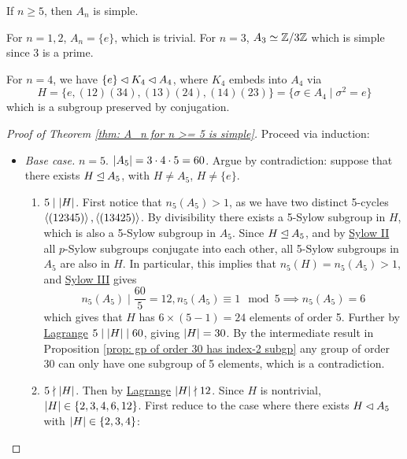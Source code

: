\begin{theorem}\label{thm: A_n for n >= 5 is simple}
    If $n \geq 5$, then $A_n$ is simple. 
\end{theorem}

\begin{remark}
    For $n = 1, 2$, $A_n = \{e\}$, which is trivial. For $n = 3$, $A_3 \simeq \mathbb{Z}/3\mathbb{Z}$ which is simple since 3 is a prime.

    For $n = 4$, we have $\{e\} \lhd K_4 \lhd A_4$, where $K_4$ embeds into $A_4$ via
    \[
        H = \{e, (1 2) (3 4), (1 3)(2 4), (1 4)(2 3)\} = \{\sigma \in A_4 \mid \sigma^2 = e\}
    \]
    which is a subgroup preserved by conjugation.
\end{remark}

\begin{proof}[Proof of Theorem \ref{thm: A_n for n >= 5 is simple}]
    Proceed via induction:
    \begin{itemize}
        \item \emph{Base case.} $n = 5$. $\left|A_5\right| = 3 \cdot 4 \cdot 5 = 60$. Argue by contradiction: suppose that there exists $H \unlhd A_5$, with $H \neq A_5$, $H \neq \{e\}$.
        \begin{enumerate}
            \item[\bu{Case 1.}] $5 \mid \left|H\right|$. First notice that $n_5(A_5) > 1$, as we have two distinct 5-cycles $\left\langle (1 2 3 4 5) \right\rangle, \left\langle (1 3 4 2 5) \right\rangle$. By divisibility there exists a 5-Sylow subgroup in $H$, which is also a 5-Sylow subgroup in $A_5$. Since $H \unlhd A_5$, and by \hyperref[thm: Sylow II]{Sylow II} all $p$-Sylow subgroups conjugate into each other, all 5-Sylow subgroups in $A_5$ are also in $H$. In particular, this implies that $n_5(H) = n_5(A_5) > 1$, and \hyperref[thm: Sylow III]{Sylow III} gives
            \[
                n_5(A_5) \mid \frac{60}{5} = 12, n_5(A_5)\equiv 1 \mod{5} \implies n_5(A_5) = 6
            \]
            which gives that $H$ has $6 \times (5 - 1) = 24$ elements of order 5. Further by \hyperref[thm: Lagrange]{Lagrange} $5 \mid \left|H\right| \mid 60$, giving $\left|H\right| = 30$. By the intermediate result in Proposition \ref{prop: gp of order 30 has index-2 subgp} any group of order 30 can only have one subgroup of 5 elements, which is a contradiction.
            \item[\bu{Case 2.}] $5 \nmid \left|H\right|$. Then by \hyperref[thm: Lagrange]{Lagrange} $\left|H\right| \nmid 12$. Since $H$ is nontrivial, $\left|H\right| \in \{2, 3, 4, 6, 12\}$. First reduce to the case where there exists $H \lhd A_5$ with $\left|H\right| \in \{2, 3, 4\}$:

\end{enumerate}
\end{itemize}
\end{proof}
